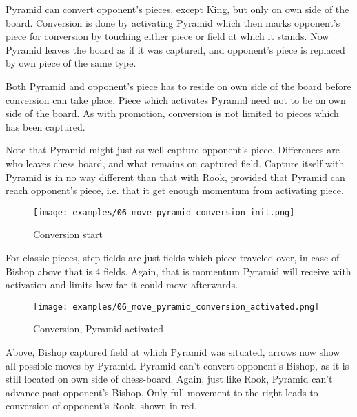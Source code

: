 Pyramid can convert opponent's pieces, except King, but only on own side of
the board. Conversion is done by activating Pyramid which then marks opponent's
piece for conversion by touching either piece or field at which it stands. Now
Pyramid leaves the board as if it was captured, and opponent's piece is replaced
by own piece of the same type.

Both Pyramid and opponent's piece has to reside on own side of the board
before conversion can take place. Piece which activates Pyramid need not
to be on own side of the board. As with promotion, conversion is not limited
to pieces which has been captured.

Note that Pyramid might just as well capture opponent's piece. Differences are
who leaves chess board, and what remains on captured field. Capture itself with
Pyramid is in no way different than that with Rook, provided that Pyramid can
reach opponent's piece, i.e. that it get enough momentum from activating piece.

\clearpage %

\noindent
\begin{figure}[!h]
\texttt{[image: examples/06\_move\_pyramid\_conversion\_init.png]}
\caption{Conversion start}
\label{fig:06_move_pyramid_conversion_init}
\end{figure}

For classic pieces, step-fields are just fields which piece traveled over,
in case of Bishop above that is 4 fields. Again, that is momentum Pyramid
will receive with activation and limits how far it could move afterwards.

\clearpage %

\noindent
\begin{figure}[!h]
\texttt{[image: examples/06\_move\_pyramid\_conversion\_activated.png]}
\caption{Conversion, Pyramid activated}
\label{fig:06_move_pyramid_conversion_activated}
\end{figure}

Above, Bishop captured field at which Pyramid was situated, arrows now show
all possible moves by Pyramid. Pyramid can't convert opponent's Bishop, as it
is still located on own side of chess-board. Again, just like Rook, Pyramid
can't advance past opponent's Bishop. Only full movement to the right leads
to conversion of opponent's Rook, shown in red.


